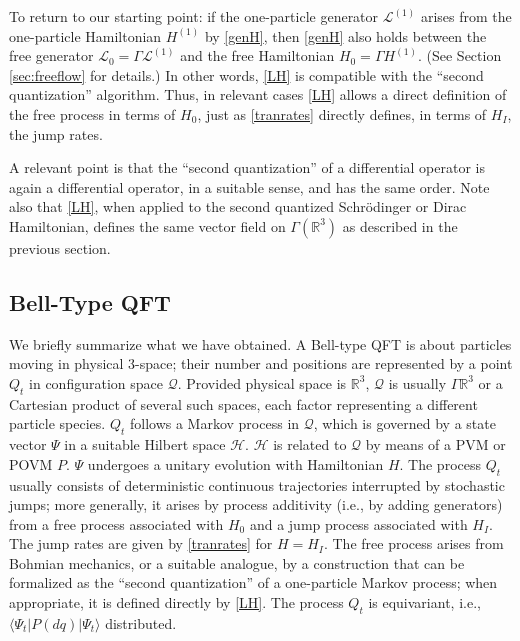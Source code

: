 \documentclass[12pt]{article}
\newcommand{\RRR}{\mathbb{R}} %
\newcommand{\1}{\mathbf{1}} %
\newcommand{\Hilbert}{\mathscr{H}}
\renewcommand{\sp}[2]{\langle #1 | #2 \rangle} %
\newcommand{\conf}{\mathcal{Q}} %
\newcommand{\generator}{\mathscr{L}} %
\newcommand{\pov}{{P}}%
\newcommand{\inter}{{I}} %
\begin{document}
To return to our starting point: if the one-particle generator
$\generator^{(1)}$ arises from the one-particle Hamiltonian $H^{(1)}$
by \eqref{genH}, then \eqref{genH} also holds between the free generator
$\generator_0 = \Gamma \generator^{(1)}$ and the free Hamiltonian $H_0
= \Gamma H^{(1)}$.  (See Section \ref{sec:freeflow} for details.) In
other words, \eqref{LH} is compatible with the ``second quantization''
algorithm.  Thus, in relevant cases \eqref{LH} allows a direct
definition of the free process in terms of $H_0$, just as
\eqref{tranrates} directly defines, in terms of $H_\inter$, the jump
rates.

A relevant point is that the ``second quantization'' of a differential
operator is again a differential operator, in a suitable sense, and
has the same order.  Note also that \eqref{LH}, when applied to the
second quantized Schr\"odinger or Dirac Hamiltonian, defines the same
vector field on $\Gamma(\RRR^3)$ as described in the previous section.


\subsection{Bell-Type QFT}

We briefly summarize what we have obtained. A Bell-type QFT is about
particles moving in physical 3-space; their number and positions are
represented by a point $Q_t$ in configuration space $\conf$.  Provided
physical space is $\RRR^3$, $\conf$ is usually $\Gamma \RRR^3$ or a
Cartesian product of several such spaces, each factor representing a
different particle species.  $Q_t$ follows a Markov process in
$\conf$, which is governed by a state vector $\Psi$ in a suitable
Hilbert space $\Hilbert$.  $\Hilbert$ is related to $\conf$ by means
of a PVM or POVM $\pov$.  $\Psi$ undergoes a unitary evolution with
Hamiltonian $H$.  The process $Q_t$ usually consists of deterministic
continuous trajectories interrupted by stochastic jumps; more
generally, it arises by process additivity (i.e., by adding
generators) from a free process associated with $H_0$ and a jump
process associated with $H_\inter$.  The jump rates are given by
\eqref{tranrates} for $H= H_\inter$.  The free process arises from
Bohmian mechanics, or a suitable analogue, by a construction that can
be formalized as the ``second quantization'' of a one-particle Markov
process; when appropriate, it is defined directly by \eqref{LH}.  The
process $Q_t$ is equivariant, i.e., $\sp{\Psi_t} {\pov(dq) |\Psi_t}$
distributed.
\end{document}
